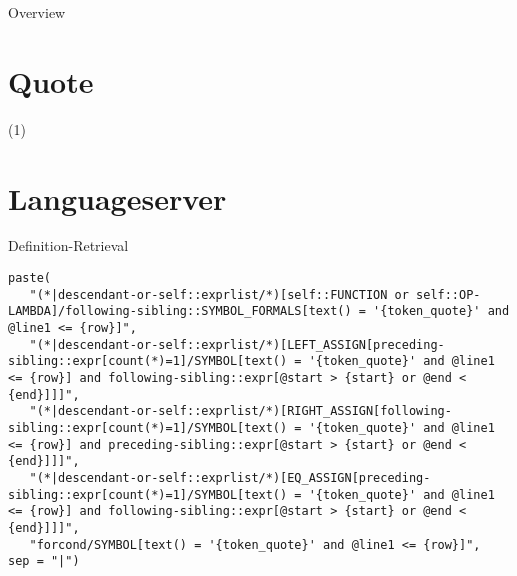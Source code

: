 \appendix

\begin{frame}{Overview}
   \tableofcontents
\end{frame}

\section{Quote}
\begin{frame}[c,plain]{}
(1)%
\end{frame}


\section{Languageserver}
\begin{frame}[fragile]{Definition-Retrieval}
%
\begin{verbatim}
paste(
   "(*|descendant-or-self::exprlist/*)[self::FUNCTION or self::OP-LAMBDA]/following-sibling::SYMBOL_FORMALS[text() = '{token_quote}' and @line1 <= {row}]",
   "(*|descendant-or-self::exprlist/*)[LEFT_ASSIGN[preceding-sibling::expr[count(*)=1]/SYMBOL[text() = '{token_quote}' and @line1 <= {row}] and following-sibling::expr[@start > {start} or @end < {end}]]]",
   "(*|descendant-or-self::exprlist/*)[RIGHT_ASSIGN[following-sibling::expr[count(*)=1]/SYMBOL[text() = '{token_quote}' and @line1 <= {row}] and preceding-sibling::expr[@start > {start} or @end < {end}]]]",
   "(*|descendant-or-self::exprlist/*)[EQ_ASSIGN[preceding-sibling::expr[count(*)=1]/SYMBOL[text() = '{token_quote}' and @line1 <= {row}] and following-sibling::expr[@start > {start} or @end < {end}]]]",
   "forcond/SYMBOL[text() = '{token_quote}' and @line1 <= {row}]",
sep = "|")
\end{verbatim}
\end{frame}

